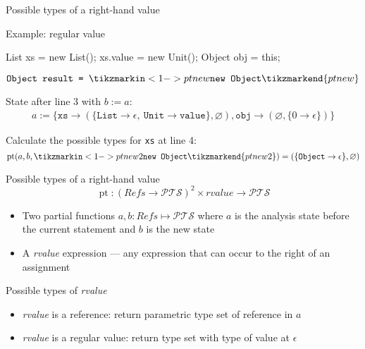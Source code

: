 \documentclass{beamer}
\begin{document}
\begin{frame}[fragile]{Possible types of a right-hand value}
\begin{block}{Example: regular value}
\begin{javacode}
List xs = new List();
xs.value = new Unit();
Object obj = this;
\end{javacode}
\vspace{-4pt}
$\texttt{Object result = } \tikzmarkin<1->{ptnew}\texttt{new Object}\tikzmarkend{ptnew}$

\vspace{5pt}
State after line 3 with $b := a$: 
\begin{align*} a := \{\mathtt{xs} \to (\{\mathtt{List} \to \epsilon,\ \mathtt{Unit} \to \mathtt{value} \}, \varnothing), \mathtt{obj} \to (\varnothing, \{ 0 \to \epsilon \}) \}
\end{align*}

\vspace{5pt} \hline \vspace{5pt}
Calculate the possible types for \texttt{xs} at line 4:
    \[ \operatorname{pt}(a,b,\tikzmarkin<1->{ptnew2}\texttt{new Object}\tikzmarkend{ptnew2}) = (\{ \mathtt{Object} \to \epsilon \}, \varnothing)\]
\end{block}
\end{frame}

\begin{frame}{Possible types of a right-hand value}
\[  \operatorname{pt} : (\mathit{Refs} \to \mathcal{PTS})^2 \times \mathit{rvalue} \to \mathcal{PTS} \]
\begin{itemize}
\item Two partial functions $a, b : \mathit{Refs} \mapsto \mathcal{PTS}$ where $a$ is the analysis state before the current statement and $b$ is the new state
\item A \emph{rvalue} expression --- any expression that can occur to the right of an assignment
\end{itemize}
\begin{block}{Possible types of \emph{rvalue}}
\begin{itemize}
\item \emph{rvalue} is a reference: return parametric type set of reference in $a$
\item \emph{rvalue} is a regular value: return type set with type of value at $\epsilon$
\end{itemize}
\end{block}
\end{frame}
\end{document}
